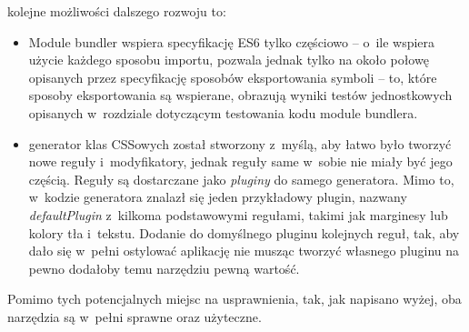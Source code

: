 \documentclass{SGGW-thesis}
\begin{document}
kolejne możliwości dalszego rozwoju to:
\begin{itemize}
    \item Module bundler wspiera specyfikację ES6 tylko częściowo -- o~ile wspiera użycie każdego sposobu importu, pozwala jednak tylko na około połowę opisanych przez specyfikację sposobów eksportowania symboli -- to, które sposoby eksportowania są wspierane, obrazują wyniki testów jednostkowych opisanych w~rozdziale dotyczącym testowania kodu module bundlera.
    \item generator klas CSSowych został stworzony z~myślą, aby łatwo było tworzyć nowe reguły i~modyfikatory, jednak reguły same w~sobie nie miały być jego częścią. Reguły są dostarczane jako \emph{pluginy} do samego generatora. Mimo to, w~kodzie generatora znalazł się jeden przykładowy plugin, nazwany \emph{defaultPlugin} z~kilkoma podstawowymi regułami, takimi jak marginesy lub kolory tła i~tekstu. Dodanie do domyślnego pluginu kolejnych reguł, tak, aby dało się w~pełni ostylować aplikację nie musząc tworzyć własnego pluginu na pewno dodałoby temu narzędziu pewną wartość.
\end{itemize}

Pomimo tych potencjalnych miejsc na usprawnienia, tak, jak napisano wyżej, oba narzędzia są w~pełni sprawne oraz użyteczne.
\end{document}
